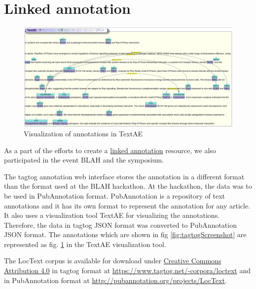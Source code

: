 \section{Linked annotation}


\begin{figure}
\centering
\includegraphics[scale=0.25]{figures/TextAE_Vis.png}
\caption{Visualization of annotations in TextAE}\label{fig:TextAEVis}
\end{figure}

As a part of the efforts to create a \hyperref[http://2015.linkedannotation.org/background]{linked annotation} resource, we also participated in the event BLAH \cite{blah} and the symposium. 

The tagtog annotation web interface stores the annotation in a different format than the format used at the BLAH hackathon. At the hackathon, the data was to be used in PubAnnotation format. PubAnnotation \cite{kim2012pubannotation} is a repository of text annotations and it has its own format to represent the annotation for any article. It also uses a visualization tool TextAE \cite{textae} for visualizing the annotations. Therefore, the data in tagtog JSON format was converted to PubAnnotation JSON format. The annotations which are shown in fig \ref{fig:tagtogScreenshot} are represented as fig. \ref{fig:TextAEVis} in the TextAE visualization tool. 

The LocText corpus is available for download under \hyperref[https://creativecommons.org/licenses/by/4.0/]{Creative Commons Attribution 4.0} in tagtog format at \url{https://www.tagtog.net/-corpora/loctext}  and in PubAnnotation format at \url{http://pubannotation.org/projects/LocText}.